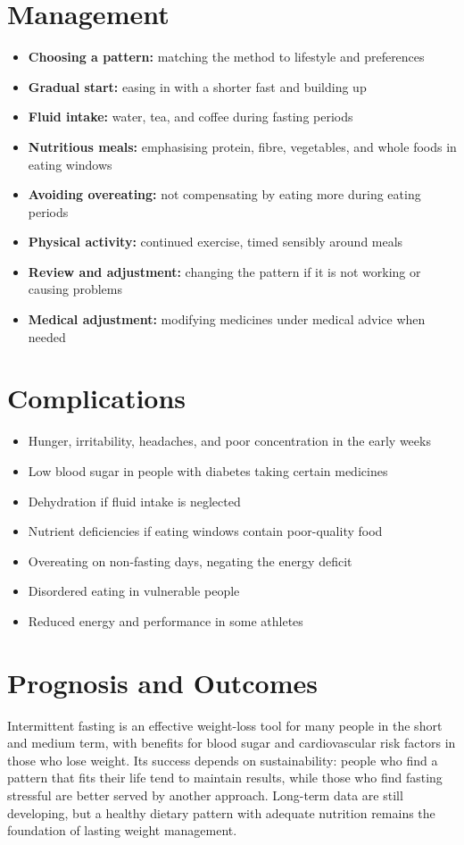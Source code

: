 \section*{Management}
\begin{itemize}
    \item \textbf{Choosing a pattern:} matching the method to lifestyle and preferences
    \item \textbf{Gradual start:} easing in with a shorter fast and building up
    \item \textbf{Fluid intake:} water, tea, and coffee during fasting periods
    \item \textbf{Nutritious meals:} emphasising protein, fibre, vegetables, and whole foods in eating windows
    \item \textbf{Avoiding overeating:} not compensating by eating more during eating periods
    \item \textbf{Physical activity:} continued exercise, timed sensibly around meals
    \item \textbf{Review and adjustment:} changing the pattern if it is not working or causing problems
    \item \textbf{Medical adjustment:} modifying medicines under medical advice when needed
\end{itemize}

\section*{Complications}
\begin{itemize}
    \item Hunger, irritability, headaches, and poor concentration in the early weeks
    \item Low blood sugar in people with diabetes taking certain medicines
    \item Dehydration if fluid intake is neglected
    \item Nutrient deficiencies if eating windows contain poor-quality food
    \item Overeating on non-fasting days, negating the energy deficit
    \item Disordered eating in vulnerable people
    \item Reduced energy and performance in some athletes
\end{itemize}

\section*{Prognosis and Outcomes}
Intermittent fasting is an effective weight-loss tool for many people in the short and medium term, with benefits for blood sugar and cardiovascular risk factors in those who lose weight. Its success depends on sustainability: people who find a pattern that fits their life tend to maintain results, while those who find fasting stressful are better served by another approach. Long-term data are still developing, but a healthy dietary pattern with adequate nutrition remains the foundation of lasting weight management.

